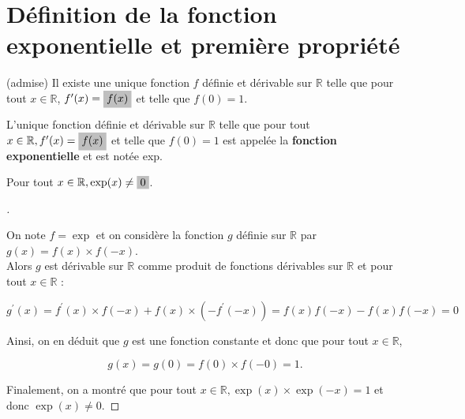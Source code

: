 \documentclass[12pt]{article}
\title{
  \vspace{4em}
  \centering
  \tcbset{colframe=BlackSav,colback=GrayBG}
  \tcbox[tikznode]{
    Chapitre 9 \\Fonction exponentielle
  }
}
\author{}
\date{}
\theoremstyle{break}
\newenvironment{demo}[1][\proofname]{%
  \begin{proof}[#1]$ $\newline
  }{%
  \end{proof}
}
\begin{document}
\maketitle

\tableofcontents

\newcommand{\hideM}[1]{\mbox{\vphantom{$#1$}\smash{\colorbox{gray!50}{$\displaystyle #1$}}} }
\newcommand{\hide}[1]{\mbox{\vphantom{#1}\smash{\colorbox{gray!50}{#1}}}}

\newpage
\section{Définition de la fonction exponentielle et première propriété}
\begin{proposition}{(admise)}{}
  Il existe une unique fonction $f$ définie et dérivable sur $\mathbb{R}$ telle que pour tout $x \in \mathbb{R}$, $f^{\prime}(x)=\hideM{f(x)}$ et telle que $f(0)=1$.
\end{proposition}

\begin{definition}{}{}
  L'unique fonction définie et dérivable sur $\mathbb{R}$ telle que pour tout $x \in \mathbb{R}, f^{\prime}(x)=\hideM{f(x)}$ et telle que $f(0)=1$ est appelée la \textbf{fonction exponentielle} et est notée exp.
\end{definition}

\begin{proposition}{}{}
  Pour tout $x \in \mathbb{R}, \exp (x) \neq \hideM{0}$.
\end{proposition}

\begin{demo}
  On note $f=\exp$ et on considère la fonction $g$ définie sur $\mathbb{R}$ par $g(x)=f(x) \times f(-x)$.\\
  Alors $g$ est dérivable sur $\mathbb{R}$ comme produit de fonctions dérivables sur $\mathbb{R}$ et pour tout $x \in \mathbb{R}$ :

  $$
  g^{\prime}(x)=f^{\prime}(x) \times f(-x)+f(x) \times\left(-f^{\prime}(-x)\right)=f(x) f(-x)-f(x) f(-x)=0
  $$

  Ainsi, on en déduit que $g$ est une fonction constante et donc que pour tout $x \in \mathbb{R}$,

  $$
  g(x)=g(0)=f(0) \times f(-0)=1 .
  $$

  Finalement, on a montré que pour tout $x \in \mathbb{R}, \exp (x) \times \exp (-x)=1$ et donc $\exp (x) \neq 0$.
\end{demo}
\end{document}
